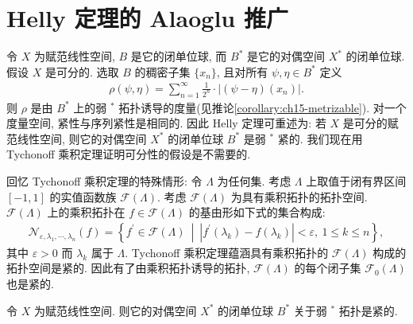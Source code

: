 \documentclass[../../main.tex]{subfiles}
\begin{document}
\section{Helly 定理的 Alaoglu 推广}\label{section:ch15-alaoglu}

令 $X$ 为赋范线性空间, $B$ 是它的闭单位球, 而 $B^{*}$ 是它的对偶空间 $X^{*}$ 的闭单位球. 假设 $X$ 是可分的. 选取 $B$ 的稠密子集 $\{x_{n}\}$, 且对所有 $\psi,\eta\in B^{*}$ 定义
\begin{align*}
\rho(\psi,\eta)=\sum_{n=1}^{\infty}\frac{1}{2^{n}}\cdot\left|(\psi-\eta)(x_{n})\right|.
\end{align*}
则 $\rho$ 是由 $B^{*}$ 上的弱 $^{*}$ 拓扑诱导的度量(见推论\cref{corollary:ch15-metrizable}). 对一个度量空间, 紧性与序列紧性是相同的. 因此 Helly 定理可重述为: 若 $X$ 是可分的赋范线性空间, 则它的对偶空间 $X^{*}$ 的闭单位球 $B^{*}$ 是弱 $^{*}$ 紧的. 我们现在用 Tychonoff 乘积定理证明可分性的假设是不需要的.

回忆 Tychonoff 乘积定理的特殊情形: 令 $\Lambda$ 为任何集. 考虑 $\Lambda$ 上取值于闭有界区间 $[-1,1]$ 的实值函数族 $\mathcal{F}(\Lambda)$. 考虑 $\mathcal{F}(\Lambda)$ 为具有乘积拓扑的拓扑空间. $\mathcal{F}(\Lambda)$ 上的乘积拓扑在 $f\in\mathcal{F}(\Lambda)$ 的基由形如下式的集合构成:
\begin{align*}
\mathcal{N}_{\varepsilon,\lambda_{1},\cdots,\lambda_{n}}(f)=\left\{f^{\prime}\in\mathcal{F}(\Lambda)\ \middle|\ \left|f^{\prime}(\lambda_{k})-f(\lambda_{k})\right|<\varepsilon,\ 1\leqslant k\leqslant n\right\},
\end{align*}
其中 $\varepsilon>0$ 而 $\lambda_{k}$ 属于 $\Lambda$. Tychonoff 乘积定理蕴涵具有乘积拓扑的 $\mathcal{F}(\Lambda)$ 构成的拓扑空间是紧的. 因此有了由乘积拓扑诱导的拓扑, $\mathcal{F}(\Lambda)$ 的每个闭子集 $\mathcal{F}_{0}(\Lambda)$ 也是紧的.

\begin{theorem}[Alaoglu]\label{theorem:ch15-alaoglu}
令 $X$ 为赋范线性空间. 则它的对偶空间 $X^{*}$ 的闭单位球 $B^{*}$ 关于弱 $^{*}$ 拓扑是紧的.
\end{theorem}
\end{document}
